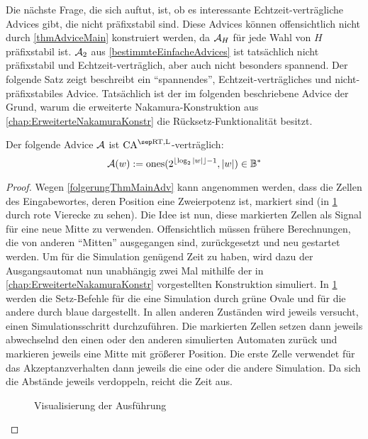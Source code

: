 Die nächste Frage, die sich auftut, ist, ob es interessante Echtzeit-verträgliche Advices gibt, die nicht präfixstabil sind.
Diese Advices können offensichtlich nicht durch \cref{thmAdviceMain} konstruiert werden, da $\mathcal{A}_H$ für jede Wahl von $H$ präfixstabil ist.
$\mathcal{A}_2$ aus \cref{bestimmteEinfacheAdvices} ist tatsächlich nicht präfixstabil und Echtzeit-verträglich, aber auch nicht besonders
spannend.
Der folgende Satz zeigt beschreibt ein \enquote{spannendes}, Echtzeit-verträgliches und nicht-präfixstabiles Advice.
Tatsächlich ist der im folgenden beschriebene Advice der Grund, warum die erweiterte Nakamura-Konstruktion aus \cref{chap:ErweiterteNakamuraKonstr} die Rücksetz-Funktionalität besitzt.

\begin{satz}
    \label{expMidAdv}
    Der folgende Advice $\mathcal{A}$ ist $\CAM{\CART, \CALeft}$-verträglich:
    \[
        \mathcal{A}(w) := \mathrm{ones}(2^{\lfloor \log_2{|w|} \rfloor - 1}, |w|) \in \mathbb{B}^*
    \]
\end{satz}
\begin{proof}
    Wegen \cref{folgerungThmMainAdv} kann angenommen werden,
    dass die Zellen des Eingabewortes, deren Position eine Zweierpotenz ist, markiert sind (in \cref{fig:ExpMidAdvice} durch rote Vierecke zu sehen).
    Die Idee ist nun, diese markierten Zellen als Signal für eine neue Mitte zu verwenden.
    Offensichtlich müssen frühere Berechnungen, die von anderen \enquote{Mitten} ausgegangen sind,
    zurückgesetzt und neu gestartet werden.
    Um für die Simulation genügend Zeit zu haben, wird dazu der Ausgangsautomat nun unabhängig zwei Mal mithilfe der in \cref{chap:ErweiterteNakamuraKonstr} vorgestellten Konstruktion simuliert.
    In \cref{fig:ExpMidAdvice} werden die Setz-Befehle
    für die eine Simulation durch grüne Ovale und für die andere durch blaue dargestellt.
    In allen anderen Zuständen wird jeweils versucht, einen Simulationsschritt durchzuführen.
    Die markierten Zellen setzen dann jeweils abwechselnd den einen oder den anderen simulierten Automaten
    zurück und markieren jeweils eine Mitte mit größerer Position.
    Die erste Zelle verwendet für das Akzeptanzverhalten dann jeweils die eine oder die andere Simulation.
    Da sich die Abstände jeweils verdoppeln, reicht die Zeit aus.
    
    \begin{figure}[h!]
        \begin{center}
            \newcommand{\setq}{\scriptsize $\mathrm{set}$}
            
        \end{center}
        \caption{Visualisierung der Ausführung}
        \label{fig:ExpMidAdvice}
    \end{figure}
\end{proof}


